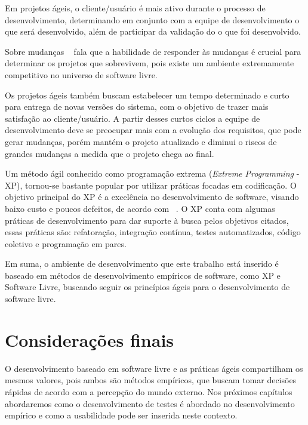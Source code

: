 Em projetos ágeis, o cliente/usuário é mais ativo durante o processo de desenvolvimento, determinando em conjunto com a equipe de desenvolvimento o que será desenvolvido, além de participar da validação do o que foi desenvolvido.

Sobre mudanças ~ fala que a habilidade de responder às mudanças é crucial para determinar os projetos que sobrevivem, pois existe um ambiente extremamente competitivo no universo de software livre.

Os projetos ágeis também buscam estabelecer um tempo determinado e curto para entrega de novas versões do sistema, com o objetivo de trazer mais satisfação ao cliente/usuário.
%
A partir desses curtos ciclos a equipe de desenvolvimento 
deve se preocupar mais com a evolução dos requisitos, que pode gerar mudanças, porém 
mantém o projeto atualizado e diminui o riscos de grandes mudanças a medida que o 
projeto chega ao final.

Um método ágil conhecido como programação extrema (\emph{Extreme Programming} - XP), 
tornou-se bastante popular por utilizar práticas focadas em codificação.
%
O objetivo principal do XP é a excelência no desenvolvimento de software, visando baixo custo e poucos defeitos, de acordo com ~. O XP conta com algumas práticas de desenvolvimento para dar suporte à busca pelos objetivos citados, essas práticas são: refatoração, integração contínua, testes automatizados, código coletivo e programação em pares.

Em suma, o ambiente de desenvolvimento que este trabalho está inserido é baseado em métodos de desenvolvimento empíricos de software, como XP e Software Livre, buscando seguir os princípios ágeis para o desenvolvimento de software livre.

\section{Considerações finais}

O desenvolvimento baseado em software livre e as práticas ágeis compartilham os mesmos valores, pois ambos são métodos empíricos, que buscam tomar decisões rápidas de acordo com a percepção do mundo externo. Nos próximos capítulos abordaremos como o desenvolvimento de testes é abordado no desenvolvimento empírico e como a usabilidade pode ser inserida neste contexto.
